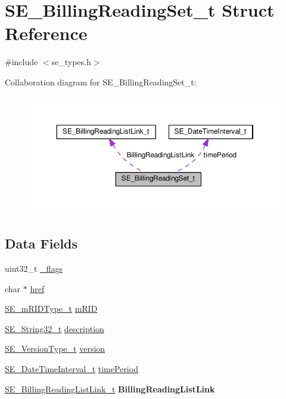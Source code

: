 \hypertarget{structSE__BillingReadingSet__t}{}\section{S\+E\+\_\+\+Billing\+Reading\+Set\+\_\+t Struct Reference}
\label{structSE__BillingReadingSet__t}


{\ttfamily \#include $<$se\+\_\+types.\+h$>$}



Collaboration diagram for S\+E\+\_\+\+Billing\+Reading\+Set\+\_\+t\+:\nopagebreak
\begin{figure}[H]
\begin{center}
\leavevmode
\includegraphics[width=350pt]{structSE__BillingReadingSet__t__coll__graph}
\end{center}
\end{figure}
\subsection*{Data Fields}
\begin{DoxyCompactItemize}
\item 
uint32\+\_\+t \hyperlink{group__BillingReadingSet_gaadb95ac5d5abb72c55f707d229888950}{\+\_\+flags}
\item 
char $\ast$ \hyperlink{group__BillingReadingSet_ga6678b851920eb4645850476a32c6441e}{href}
\item 
\hyperlink{group__mRIDType_gac74622112f3a388a2851b2289963ba5e}{S\+E\+\_\+m\+R\+I\+D\+Type\+\_\+t} \hyperlink{group__BillingReadingSet_gac13de96611c3eee1e7fd3ca8c2c012b5}{m\+R\+ID}
\item 
\hyperlink{group__String32_gac9f59b06b168b4d2e0d45ed41699af42}{S\+E\+\_\+\+String32\+\_\+t} \hyperlink{group__BillingReadingSet_ga29d6702bd43f699cb3702eb0ca024aba}{description}
\item 
\hyperlink{group__VersionType_ga4b8d27838226948397ed99f67d46e2ae}{S\+E\+\_\+\+Version\+Type\+\_\+t} \hyperlink{group__BillingReadingSet_ga6cf80b1bd407c3e29e5504fd19cd6359}{version}
\item 
\hyperlink{structSE__DateTimeInterval__t}{S\+E\+\_\+\+Date\+Time\+Interval\+\_\+t} \hyperlink{group__BillingReadingSet_ga18291782c5aa9a4ddfc21dc65d43bae0}{time\+Period}
\item 
\hyperlink{structSE__BillingReadingListLink__t}{S\+E\+\_\+\+Billing\+Reading\+List\+Link\+\_\+t} {\bfseries Billing\+Reading\+List\+Link}
\end{DoxyCompactItemize}


